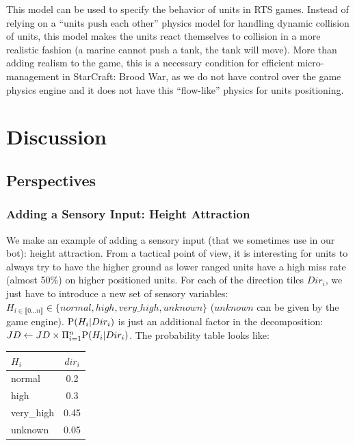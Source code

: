 This model can be used to specify the behavior of units in RTS games. Instead of relying on a ``units push each other'' physics model for handling dynamic collision of units, this model makes the units react themselves to collision in a more realistic fashion (a marine cannot push a tank, the tank will move). More than adding realism to the game, this is a necessary condition for efficient micro-management in StarCraft: Brood War, as we do not have control over the game physics engine and it does not have this ``flow-like'' physics for units positioning.

\section{Discussion}

\subsection{Perspectives}

\subsubsection{Adding a Sensory Input: Height Attraction}
We make an example of adding a sensory input (that we sometimes use in our bot): height attraction. From a tactical point of view, it is interesting for units to always try to have the higher ground as lower ranged units have a high miss rate (almost 50\%) on higher positioned units. For each of the direction tiles $Dir_i$, we just have to introduce a new set of sensory variables: $H_{i \in \llbracket 0 \dots n \rrbracket} \in \{normal, high, very\_high, unknown\}$ ($unknown$ can be given by the game engine). $\mathrm{P}(H_i|Dir_i)$ is just an additional factor in the decomposition: $JD \leftarrow JD \times \Pi_{i=1}^{n}\mathrm{P}(H_i|Dir_i)$. The probability table looks like:
\begin{center}
\begin{tabular}{|l|c|}
\hline
$H_i$ & $dir_i$ \\
\hline
normal & 0.2 \\
high & 0.3 \\
very\_high & 0.45 \\
unknown & 0.05 \\
\hline
\end{tabular}
\end{center}


